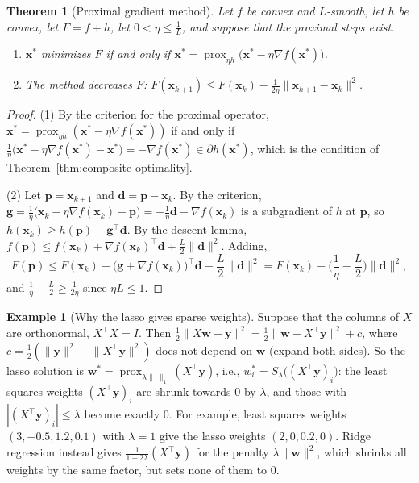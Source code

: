 \documentclass[11pt]{article}
\newcommand{\norm}[1]{\lVert #1 \rVert}
\theoremstyle{definition}
\newtheorem{example}[definition]{Example}
\theoremstyle{plain}
\newtheorem{theorem}[definition]{Theorem}
\theoremstyle{remark}
\begin{document}
\begin{theorem}[Proximal gradient method]\label{thm:prox-gradient}
    Let $f$ be convex and $L$-smooth, let $h$ be convex, let $F = f + h$, let $0 < \eta \leq \frac{1}{L}$, and suppose that the proximal steps exist.
    \begin{enumerate}
        \item $\mathbf{x}^*$ minimizes $F$ if and only if $\mathbf{x}^* = \operatorname{prox}_{\eta h}\big(\mathbf{x}^* - \eta\nabla f(\mathbf{x}^*)\big)$.
        \item The method decreases $F$: $F(\mathbf{x}_{k+1}) \leq F(\mathbf{x}_k) - \frac{1}{2\eta}\norm{\mathbf{x}_{k+1} - \mathbf{x}_k}^2$.
    \end{enumerate}
\end{theorem}

\begin{proof}
    (1) By the criterion for the proximal operator, $\mathbf{x}^* = \operatorname{prox}_{\eta h}(\mathbf{x}^* - \eta\nabla f(\mathbf{x}^*))$ if and only if $\frac{1}{\eta}\big(\mathbf{x}^* - \eta\nabla f(\mathbf{x}^*) - \mathbf{x}^*\big) = -\nabla f(\mathbf{x}^*) \in \partial h(\mathbf{x}^*)$, which is the condition of Theorem~\ref{thm:composite-optimality}.

    (2) Let $\mathbf{p} = \mathbf{x}_{k+1}$ and $\mathbf{d} = \mathbf{p} - \mathbf{x}_k$. By the criterion, $\mathbf{g} = \frac{1}{\eta}\big(\mathbf{x}_k - \eta\nabla f(\mathbf{x}_k) - \mathbf{p}\big) = -\frac{1}{\eta}\mathbf{d} - \nabla f(\mathbf{x}_k)$ is a subgradient of $h$ at $\mathbf{p}$, so $h(\mathbf{x}_k) \geq h(\mathbf{p}) - \mathbf{g}^\top\mathbf{d}$. By the descent lemma, $f(\mathbf{p}) \leq f(\mathbf{x}_k) + \nabla f(\mathbf{x}_k)^\top\mathbf{d} + \frac{L}{2}\norm{\mathbf{d}}^2$. Adding,
    \[F(\mathbf{p}) \leq F(\mathbf{x}_k) + \big(\mathbf{g} + \nabla f(\mathbf{x}_k)\big)^\top\mathbf{d} + \frac{L}{2}\norm{\mathbf{d}}^2 = F(\mathbf{x}_k) - \Big(\frac{1}{\eta} - \frac{L}{2}\Big)\norm{\mathbf{d}}^2,\]
    and $\frac{1}{\eta} - \frac{L}{2} \geq \frac{1}{2\eta}$ since $\eta L \leq 1$.
\end{proof}

\begin{example}[Why the lasso gives sparse weights]\label{ex:lasso}
    Suppose that the columns of $X$ are orthonormal, $X^\top X = I$. Then $\frac{1}{2}\norm{X\mathbf{w} - \mathbf{y}}^2 = \frac{1}{2}\norm{\mathbf{w} - X^\top\mathbf{y}}^2 + c$, where $c = \frac{1}{2}(\norm{\mathbf{y}}^2 - \norm{X^\top\mathbf{y}}^2)$ does not depend on $\mathbf{w}$ (expand both sides). So the lasso solution is $\mathbf{w}^* = \operatorname{prox}_{\lambda\norm{\cdot}_1}(X^\top\mathbf{y})$, i.e., $w_i^* = S_\lambda\big((X^\top\mathbf{y})_i\big)$: the least squares weights $(X^\top\mathbf{y})_i$ are shrunk towards $0$ by $\lambda$, and those with $|(X^\top\mathbf{y})_i| \leq \lambda$ become exactly $0$. For example, least squares weights $(3, -0.5, 1.2, 0.1)$ with $\lambda = 1$ give the lasso weights $(2, 0, 0.2, 0)$. Ridge regression instead gives $\frac{1}{1 + 2\lambda}(X^\top\mathbf{y})$ for the penalty $\lambda\norm{\mathbf{w}}^2$, which shrinks all weights by the same factor, but sets none of them to $0$.
\end{example}
\end{document}
